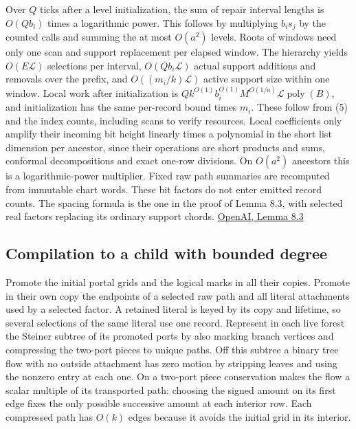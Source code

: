 \documentclass[11pt]{article}
\begin{document}
Over \(Q\) ticks after a level initialization, the sum of repair interval lengths is \(O(Qb_i)\) times a logarithmic power. This follows by multiplying \(b_i s_j\) by the counted calls and summing the at most \(O(a^2)\) levels. Roots of windows need only one scan and support replacement per elapsed window. The hierarchy yields \(O(E\mathcal L)\) selections per interval, \(O(Qb_i\mathcal L)\) actual support additions and removals over the prefix, and \(O((m_i/k)\mathcal L)\) active support size within one window. Local work after initialization is \(Q k^{O(1)}b_i^{O(1)} M^{O(1/a)}\mathcal L\operatorname{poly}(B)\), and initialization has the same per-record bound times \(m_i\). These follow from (5) and the index counts, including scans to verify resources. Local coefficients only amplify their incoming bit height linearly times a polynomial in the short list dimension per ancestor, since their operations are short products and sums, conformal decompositions and exact one-row divisions. On \(O(a^2)\) ancestors this is a logarithmic-power multiplier. Fixed raw path summaries are recomputed from immutable chart words. These bit factors do not enter emitted record counts. The spacing formula is the one in the proof of Lemma 8.3, with selected real factors replacing its ordinary support chords. \href{https://raw.githubusercontent.com/openai/math/adc7f1241b42e322a6451854ab7e4b4c146bf78a/preprints/Almost-Linear-Time-Maximum-Cardinality-Matching-in-Sparse-General-Graphs-September-24-2026/main.pdf\#page=66}{OpenAI, Lemma 8.3}

\hypertarget{compilation-to-a-child-with-bounded-degree}{%
\subsection{Compilation to a child with bounded degree}\label{compilation-to-a-child-with-bounded-degree}}

Promote the initial portal grids and the logical marks in all their copies. Promote in their own copy the endpoints of a selected raw path and all literal attachments used by a selected factor. A retained literal is keyed by its copy and lifetime, so several selections of the same literal use one record. Represent in each live forest the Steiner subtree of its promoted ports by also marking branch vertices and compressing the two-port pieces to unique paths. Off this subtree a binary tree flow with no outside attachment has zero motion by stripping leaves and using the nonzero entry at each one. On a two-port piece conservation makes the flow a scalar multiple of its transported path: choosing the signed amount on its first edge fixes the only possible successive amount at each interior row. Each compressed path has \(O(k)\) edges because it avoids the initial grid in its interior.
\end{document}

